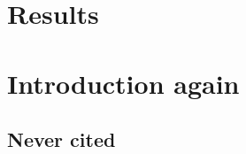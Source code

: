 \section{Results}\label{sec:results}
\section{Introduction again}\label{sec:intro}
\subsection{Never cited}\label{sec:orphan}
